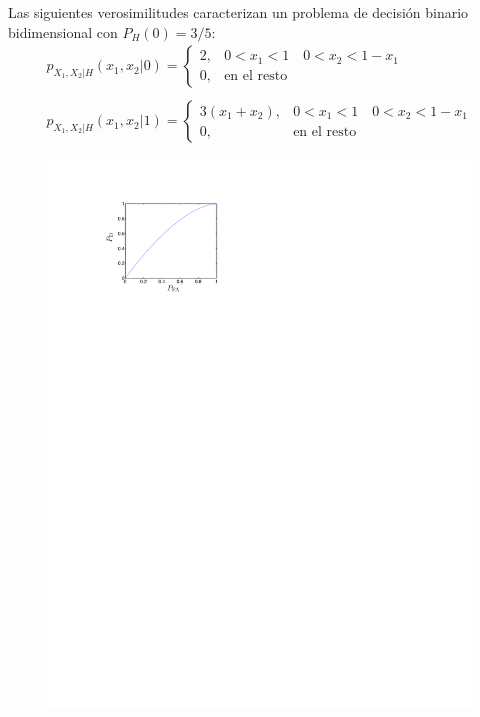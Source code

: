 \ifspanish

\question Las siguientes verosimilitudes caracterizan un problema de decisión binario bidimensional con  $P_H(0)=3/5$:
$$	\begin{array}{l}
					  p_{X_1,X_2|H}(x_1,x_2|0) = \left\lbrace   \begin{array}{ll} 
					  2, &  0<x_1<1 \quad 0<x_2<1-x_1  \\
					  0, & \mbox{en el resto}					  
					   \end{array}\right.  \\ 
					   \; \\
					  p_{X_1,X_2|H}(x_1,x_2|1) = \left\lbrace   \begin{array}{ll} 
					  3\left( x_1+x_2\right) , & 0<x_1<1 \quad 0<x_2<1-x_1 \\
					  0, & \mbox{en el resto}					  
					   \end{array}\right.  			
					  \end{array}	  $$
  
\begin{figure}[h]
\begin{center}
\includegraphics[width=14cm, trim=0cm 22cm 7cm 2cm]{Figuras/ROC}
\end{center}
\end{figure}

